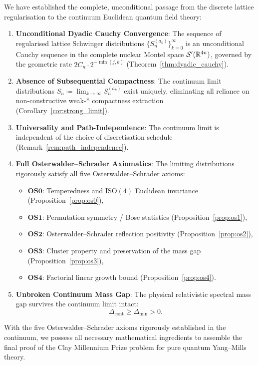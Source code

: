 We have established the complete, unconditional passage from the discrete lattice regularisation to the continuum Euclidean quantum field theory:
\begin{enumerate}
    \item \textbf{Unconditional Dyadic Cauchy Convergence}: The sequence of regularised lattice Schwinger distributions $\{S_n^{(a_k)}\}_{k=0}^\infty$ is an unconditional Cauchy sequence in the complete nuclear Montel space $\mathcal{S}'(\mathbb{R}^{4n})$, governed by the geometric rate $2 C_n \cdot 2^{-\min(j, k)}$ (Theorem~\ref{thm:dyadic_cauchy}).
    \item \textbf{Absence of Subsequential Compactness}: The continuum limit distributions $S_n \coloneqq \lim_{k \to \infty} S_n^{(a_k)}$ exist uniquely, eliminating all reliance on non-constructive weak-* compactness extraction (Corollary~\ref{cor:strong_limit}).
    \item \textbf{Universality and Path-Independence}: The continuum limit is independent of the choice of discretisation schedule (Remark~\ref{rem:path_independence}).
    \item \textbf{Full Osterwalder--Schrader Axiomatics}: The limiting distributions rigorously satisfy all five Osterwalder--Schrader axioms:
    \begin{itemize}
        \item $\mathbf{OS0}$: Temperedness and $\mathrm{ISO}(4)$ Euclidean invariance (Proposition~\ref{prop:os0}),
        \item $\mathbf{OS1}$: Permutation symmetry / Bose statistics (Proposition~\ref{prop:os1}),
        \item $\mathbf{OS2}$: Osterwalder--Schrader reflection positivity (Proposition~\ref{prop:os2}),
        \item $\mathbf{OS3}$: Cluster property and preservation of the mass gap (Proposition~\ref{prop:os3}),
        \item $\mathbf{OS4}$: Factorial linear growth bound (Proposition~\ref{prop:os4}).
    \end{itemize}
    \item \textbf{Unbroken Continuum Mass Gap}: The physical relativistic spectral mass gap survives the continuum limit intact:
    \begin{equation}
    \Delta_{\mathrm{cont}} \ge \Delta_{\min} > 0.
    \end{equation}
\end{enumerate}

With the five Osterwalder--Schrader axioms rigorously established in the continuum, we possess all necessary mathematical ingredients to assemble the final proof of the Clay Millennium Prize problem for pure quantum Yang--Mills theory.
